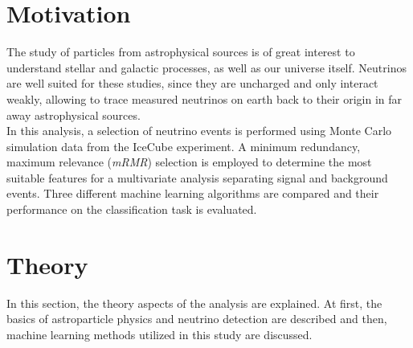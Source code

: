 \section{Motivation}
The study of particles from astrophysical sources is of great interest to understand stellar and galactic processes, as well as our universe itself.
Neutrinos are well suited for these studies, since they are uncharged and only interact weakly, allowing to trace measured neutrinos on earth back to their origin
in far away astrophysical sources. \\
In this analysis, a selection of neutrino events is performed using Monte Carlo simulation data from the IceCube experiment. 
A minimum redundancy, maximum relevance (\textit{mRMR}) selection is employed to determine the most suitable features for a multivariate analysis 
separating signal and background events. Three different machine learning algorithms are compared and their performance on the classification task is evaluated.


\section{Theory}
\label{sec:Theory}
In this section, the theory aspects of the analysis are explained.
At first, the basics of astroparticle physics and neutrino detection are described and then, machine learning methods utilized in this study are discussed. 


